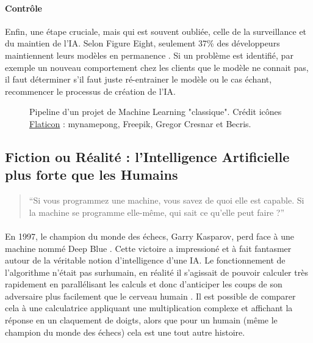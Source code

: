 \documentclass[10pt, french, a4paper]{report}
\begin{document}
\paragraph{Contrôle}
Enfin, une étape cruciale, mais qui est souvent oubliée, celle de la surveillance et du maintien de l'IA. Selon Figure Eight, seulement 37\% des développeurs maintiennent leurs modèles en permanence \citep{figure_eight_state_2019}. Si un problème est identifié, par exemple un nouveau comportement chez les clients que le modèle ne connait pas, il faut déterminer s'il faut juste ré-entrainer le modèle ou le cas échant, recommencer le processus de création de l'IA.  

\begin{center}
\begin{figure}[hbt!]
    \caption{Pipeline d'un projet de Machine Learning "classique". Crédit icônes \href{https://www.flaticon.com/}{Flaticon} : mynamepong, Freepik, Gregor Cresnar et Becris.}
\end{figure}
\end{center}

\subsection{Fiction ou Réalité : l'Intelligence Artificielle plus forte que les Humains}

\begin{quotation}
  ``Si vous programmez une machine, vous savez de quoi elle est capable. Si la machine se programme elle-même, qui sait ce qu'elle peut faire ?''
\end{quotation}

\paragraph{}
En 1997, le champion du monde des échecs, Garry Kasparov, perd face à une machine nommé Deep Blue \citep{krauthammer_be_1997}. Cette victoire a impressioné et à fait fantasmer autour de la véritable notion d'intelligence d'une IA. Le fonctionnement de l'algorithme n'était pas surhumain, en réalité il s'agissait de pouvoir calculer très rapidement en parallélisant les calculs et donc d’anticiper les coups de son adversaire plus facilement que le cerveau humain \citep{hsu_deep_1995}. Il est possible de comparer cela à une calculatrice appliquant une multiplication complexe et affichant la réponse en un claquement de doigts, alors que pour un humain (même le champion du monde des échecs) cela est une tout autre histoire.
\end{document}
